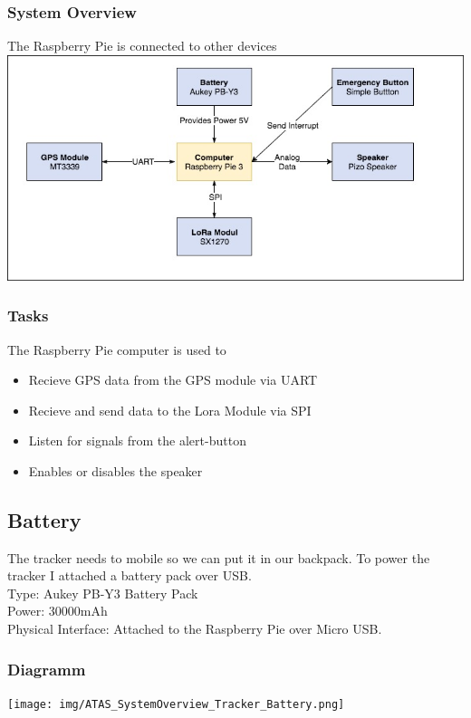 \documentclass[a4paper,11pt, oneside]{report}
\theoremstyle{definition}
\begin{document}
\subsubsection{System Overview}
The Raspberry Pie is connected to other devices\\[0.3cm]
\includegraphics[width=\textwidth]{img/ATAS_SystemOverview_Tracker_Computer.jpg}

\subsubsection{Tasks}
The Raspberry Pie computer is used to
\begin{itemize}
\item Recieve GPS data from the GPS module via UART
\item Recieve and send data to the Lora Module via SPI
\item Listen for signals from the alert-button
\item Enables or disables the speaker
\end{itemize}


\newpage
\subsection{Battery}
The tracker needs to mobile so we can put it in our backpack. To power the tracker I attached a battery pack over USB.\\[0.3cm]
Type: Aukey PB-Y3 Battery Pack\\
Power: 30000mAh\\
Physical Interface: Attached to the Raspberry Pie over Micro USB.
\subsubsection{Diagramm}
\texttt{[image: img/ATAS\_SystemOverview\_Tracker\_Battery.png]}
\end{document}
